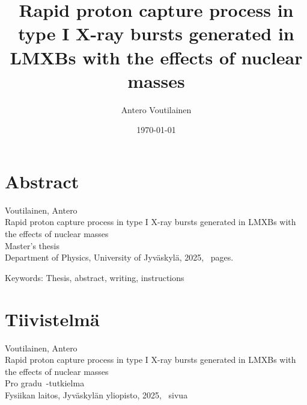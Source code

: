 \documentclass[final]{thesis} %
\title{Rapid proton capture process in type I X-ray bursts generated in LMXBs with the effects of nuclear masses}
\author{Antero Voutilainen}
\date{\today}
\begin{document}
\titleJYFL


\section*{Abstract}

\begin{singlespace}
	Voutilainen, Antero\\
	Rapid proton capture process in type I X-ray bursts generated in LMXBs with the effects of nuclear masses \\
	Master’s thesis \\
	Department of Physics, University of Jyväskylä, 2025, \pageref{LastPage}~pages.
\end{singlespace}

\bigskip

\begin{comment}
\noindent This should be written in English. \lipsum[1]
\end{comment}

\bigskip 

\noindent Keywords: Thesis, abstract, writing, instructions

\section*{Tiivistelmä}

\begin{singlespace}
	Voutilainen, Antero\\ 
	Rapid proton capture process in type I X-ray bursts generated in LMXBs with the effects of nuclear masses\\
	Pro gradu~-tutkielma\\ 
	Fysiikan laitos, Jyväskylän yliopisto, 2025, \pageref{LastPage}~sivua
\end{singlespace}
\end{document}
